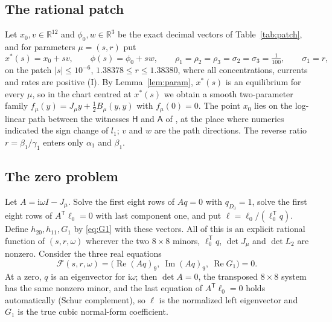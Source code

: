 \documentclass[11pt,a4paper]{article}
\theoremstyle{plain}
\theoremstyle{definition}
\theoremstyle{remark}
\newcommand{\R}{\mathbb R}
\newcommand{\ii}{\mathrm i}
\newcommand{\T}{\mathsf T}
\newcommand{\abs}[1]{\lvert#1\rvert}
\DeclareMathOperator{\Ree}{Re}
\DeclareMathOperator{\Imm}{Im}
\newcommand{\evI}{\textsf{I}}
\begin{document}
\subsection{The rational patch}
Let $x_0,v\in\R^{12}$ and $\phi_0,w\in\R^3$ be the exact decimal vectors of Table~\ref{tab:patch}, and for parameters $\mu=(s,r)$ put
\begin{equation}\label{eq:patch}
x^*(s)=x_0+sv,\qquad \phi(s)=\phi_0+sw,\qquad \rho_1=\rho_2=\rho_3=\sigma_2=\sigma_3=\tfrac1{100},\qquad\sigma_1=r,
\end{equation}
on the patch $\abs s\le10^{-6}$, $1.38378\le r\le1.38380$, where all concentrations, currents and rates are positive (\evI). By Lemma~\ref{lem:param}, $x^*(s)$ is an equilibrium for every $\mu$, so in the chart centred at $x^*(s)$ we obtain a smooth two-parameter family $f_\mu(y)=J_\mu y+\frac12B_\mu(y,y)$ with $f_\mu(0)=0$. The point $x_0$ lies on the log-linear path between the witnesses $\mathsf H$ and $\mathsf A$ of \cite{CompanionOscillations}, at the place where numerics indicated the sign change of $l_1$; $v$ and $w$ are the path directions. The reverse ratio $r=\beta_1/\gamma_1$ enters only $\alpha_1$ and $\beta_1$.

\subsection{The zero problem}
Let $A=\ii\omega I-J_\mu$. Solve the first eight rows of $Aq=0$ with $q_{D_3}=1$, solve the first eight rows of $A^\T\ell_0=0$ with last component one, and put $\ell=\ell_0/(\ell_0^\T q)$. Define $h_{20},h_{11},G_1$ by \eqref{eq:G1} with these vectors. All of this is an explicit rational function of $(s,r,\omega)$ wherever the two $8\times8$ minors, $\ell_0^\T q$, $\det J_\mu$ and $\det L_2$ are nonzero. Consider the three real equations
\begin{equation}\label{eq:zero}
\mathcal F(s,r,\omega)=\bigl(\Ree (Aq)_9,\ \Imm (Aq)_9,\ \Ree G_1\bigr)=0 .
\end{equation}
At a zero, $q$ is an eigenvector for $\ii\omega$; then $\det A=0$, the transposed $8\times8$ system has the same nonzero minor, and the last equation of $A^\T\ell_0=0$ holds automatically (Schur complement), so $\ell$ is the normalized left eigenvector and $G_1$ is the true cubic normal-form coefficient.
\end{document}

